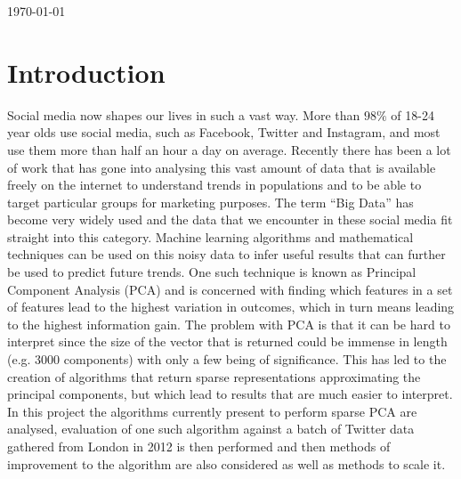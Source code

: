 \documentclass[11pt,a4paper]{article}
\begin{document}
\begin{titlepage}

{\large \today}\\[3cm] %

\vfill %

\end{titlepage}





\newpage





{}

\section{Introduction}
Social media now shapes our lives in such a vast way. More than $98\%$ of 18-24 year olds use social media, such as Facebook, Twitter and Instagram, and most use them more than half an hour a day on average\cite{statbrain}. Recently there has been a lot of work that has gone into analysing this vast amount of data that is available freely on the internet to understand trends in populations and to be able to target particular groups for marketing purposes. The term ``Big Data'' has become very widely used and the data that we encounter in these social media fit straight into this category. Machine learning algorithms and mathematical techniques can be used on this noisy data to infer useful results that can further be used to predict future trends. 
One such technique is known as Principal Component Analysis (PCA) and is concerned with finding which features in a set of features lead to the highest variation in outcomes, which in turn means leading to the highest information gain. The problem with PCA is that it can be hard to interpret since the size of the vector that is returned could be immense in length (e.g. 3000 components) with only a few being of significance. This has led to the creation of algorithms that return sparse representations approximating the principal components, but which lead to results that are much easier to interpret. In this project the algorithms currently present to perform sparse PCA are analysed, evaluation of one such algorithm against a batch of Twitter data gathered from London in 2012 is then performed and then methods of improvement to the algorithm are also considered as well as methods to scale it. 
\end{document}
